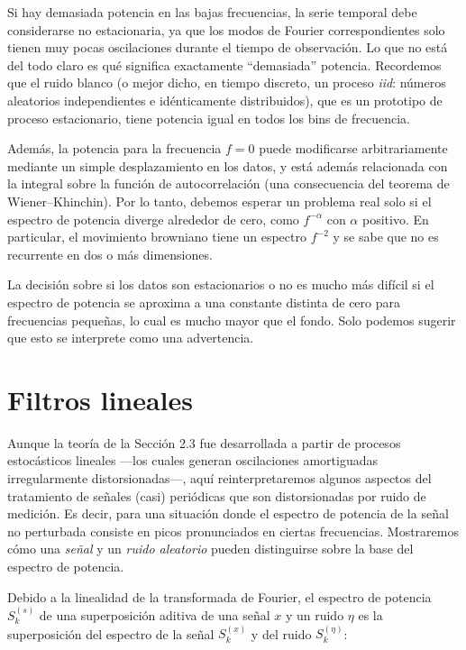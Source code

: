 \documentclass[10pt,a4paper]{book}
\begin{document}
Si hay demasiada potencia en las bajas frecuencias, la serie temporal debe considerarse no estacionaria, ya que los modos de Fourier correspondientes solo tienen muy pocas oscilaciones durante el tiempo de observación. Lo que no está del todo claro es qué significa exactamente “demasiada” potencia. Recordemos que el ruido blanco (o mejor dicho, en tiempo discreto, un proceso \emph{iid}: números aleatorios independientes e idénticamente distribuidos), que es un prototipo de proceso estacionario, tiene potencia igual en todos los bins de frecuencia.  

\bigskip

Además, la potencia para la frecuencia $f=0$ puede modificarse arbitrariamente mediante un simple desplazamiento en los datos, y está además relacionada con la integral sobre la función de autocorrelación (una consecuencia del teorema de Wiener–Khinchin). Por lo tanto, debemos esperar un problema real solo si el espectro de potencia diverge alrededor de cero, como $f^{-\alpha}$ con $\alpha$ positivo. En particular, el movimiento browniano tiene un espectro $f^{-2}$ y se sabe que no es recurrente en dos o más dimensiones.  

La decisión sobre si los datos son estacionarios o no es mucho más difícil si el espectro de potencia se aproxima a una constante distinta de cero para frecuencias pequeñas, lo cual es mucho mayor que el fondo. Solo podemos sugerir que esto se interprete como una advertencia.

\newpage

\section{Filtros lineales}

Aunque la teoría de la Sección 2.3 fue desarrollada a partir de procesos estocásticos lineales —los cuales generan oscilaciones amortiguadas irregularmente distorsionadas—, aquí reinterpretaremos algunos aspectos del tratamiento de señales (casi) periódicas que son distorsionadas por ruido de medición. Es decir, para una situación donde el espectro de potencia de la señal no perturbada consiste en picos pronunciados en ciertas frecuencias. Mostraremos cómo una \emph{señal} y un \emph{ruido aleatorio} pueden distinguirse sobre la base del espectro de potencia.  

Debido a la linealidad de la transformada de Fourier, el espectro de potencia $S_k^{(s)}$ de una superposición aditiva de una señal $x$ y un ruido $\eta$ es la superposición del espectro de la señal $S_k^{(x)}$ y del ruido $S_k^{(\eta)}$:
\end{document}
